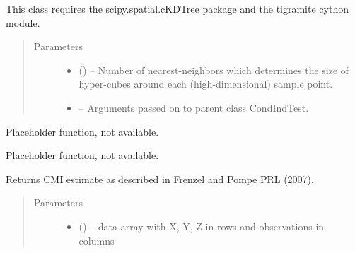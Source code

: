 \documentclass[letterpaper,10pt,english]{sphinxmanual}
\begin{document}
\begin{fulllineitems}
This class requires the scipy.spatial.cKDTree package and the tigramite
cython module.
\begin{quote}\begin{description}
\item[{Parameters}] \leavevmode\begin{itemize}
\item {} 
 (\sphinxstyleliteralemphasis{, }\sphinxstyleliteralemphasis{ (}\sphinxstyleliteralemphasis{)}\sphinxstyleliteralemphasis{}) -- Number of nearest-neighbors which determines the size of hyper-cubes
around each (high-dimensional) sample point.

\item {} 
 -- Arguments passed on to parent class CondIndTest.

\end{itemize}

\end{description}\end{quote}

\begin{fulllineitems}
\label{\detokenize{index:tigramite.independence_tests.CMIknn.get_analytic_confidence}}
Placeholder function, not available.

\end{fulllineitems}


\begin{fulllineitems}
\label{\detokenize{index:tigramite.independence_tests.CMIknn.get_analytic_significance}}
Placeholder function, not available.

\end{fulllineitems}


\begin{fulllineitems}
\label{\detokenize{index:tigramite.independence_tests.CMIknn.get_dependence_measure}}
Returns CMI estimate as described in Frenzel and Pompe PRL (2007).
\begin{quote}\begin{description}
\item[{Parameters}] \leavevmode\begin{itemize}
\item {} 
 () -- data array with X, Y, Z in rows and observations in columns


\end{itemize}
\end{description}
\end{quote}
\end{fulllineitems}
\end{fulllineitems}
\end{document}
